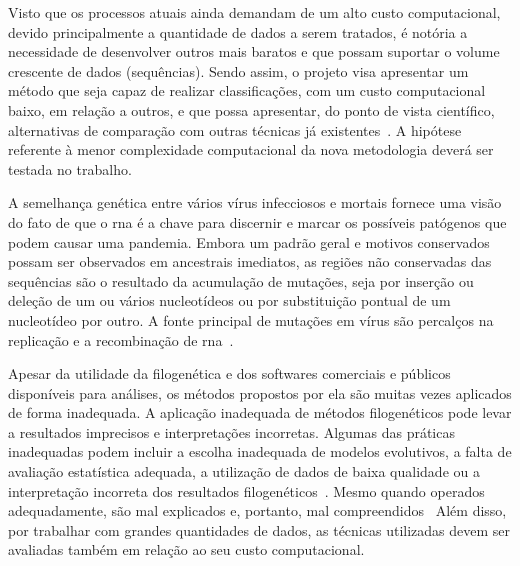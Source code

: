 Visto que os processos atuais ainda demandam de um alto custo computacional, devido principalmente a quantidade de dados a serem tratados, é notória a necessidade de desenvolver outros mais baratos e que possam suportar o volume crescente de dados (sequências).
Sendo assim, o projeto visa apresentar um método que seja capaz de realizar classificações, com um custo computacional baixo, em relação a outros, e que possa apresentar, do ponto de vista científico, alternativas de comparação com outras técnicas já existentes~\cite{frank_chemistry_2017,gene_brow_2020}. A hipótese referente à menor complexidade computacional da nova metodologia deverá ser testada no trabalho.

A semelhança genética entre vários vírus infecciosos e mortais fornece uma visão do fato de que o \gls{rna} é a chave para discernir e marcar os possíveis patógenos que podem causar uma pandemia. Embora um padrão geral e motivos conservados possam ser observados em ancestrais imediatos, as regiões não conservadas das sequências são o resultado da acumulação de mutações, seja por inserção ou deleção de um ou vários nucleotídeos ou por substituição pontual de um nucleotídeo por outro. A fonte principal de mutações em vírus são percalços na replicação e a recombinação de \gls{rna}~\cite{behl_threat_2022}.

Apesar da utilidade da filogenética e dos softwares comerciais e públicos disponíveis para análises, os métodos propostos por ela são muitas vezes aplicados de forma inadequada. A aplicação inadequada de métodos filogenéticos pode levar a resultados imprecisos e interpretações incorretas. Algumas das práticas inadequadas podem incluir a escolha inadequada de modelos evolutivos, a falta de avaliação estatística adequada, a utilização de dados de baixa qualidade ou a interpretação incorreta dos resultados filogenéticos~\cite{felsenstein_inferring_2004,mrbayes_huelsenbeck_2001}. Mesmo quando operados adequadamente, são mal explicados e, portanto, mal compreendidos~\cite[p. 1]{barry_phylogenetic_analysis_2006} Além disso, por trabalhar com grandes quantidades de dados, as técnicas utilizadas devem ser avaliadas também em relação ao seu custo computacional.


